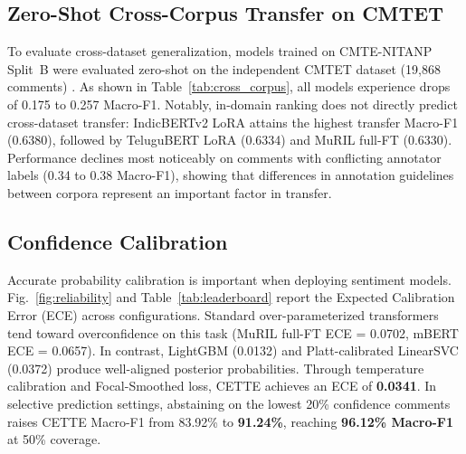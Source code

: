 \documentclass[10pt,conference]{IEEEtran}
\begin{document}
\subsection{Zero-Shot Cross-Corpus Transfer on CMTET}
To evaluate cross-dataset generalization, models trained on CMTE-NITANP Split~B were evaluated zero-shot on the independent CMTET dataset (19{,}868 comments) \cite{kusampudi2021}. As shown in Table~\ref{tab:cross_corpus}, all models experience drops of 0.175 to 0.257 Macro-F1. Notably, in-domain ranking does not directly predict cross-dataset transfer: IndicBERTv2 LoRA attains the highest transfer Macro-F1 (0.6380), followed by TeluguBERT LoRA (0.6334) and MuRIL full-FT (0.6330). Performance declines most noticeably on comments with conflicting annotator labels (0.34 to 0.38 Macro-F1), showing that differences in annotation guidelines between corpora represent an important factor in transfer.

\begin{table}[t]
\caption{Zero-shot cross-corpus generalization from CMTE-NITANP Split~B to CMTET (19{,}868 instances).}
\label{tab:cross_corpus}
\centering
\footnotesize
\setlength{\tabcolsep}{3.5pt}
\end{table}

\subsection{Confidence Calibration}
Accurate probability calibration is important when deploying sentiment models. Fig.~\ref{fig:reliability} and Table~\ref{tab:leaderboard} report the Expected Calibration Error (ECE) across configurations. Standard over-parameterized transformers tend toward overconfidence on this task (MuRIL full-FT ECE = 0.0702, mBERT ECE = 0.0657). In contrast, LightGBM (0.0132) and Platt-calibrated LinearSVC (0.0372) produce well-aligned posterior probabilities. Through temperature calibration and Focal-Smoothed loss, CETTE achieves an ECE of \textbf{0.0341}. In selective prediction settings, abstaining on the lowest 20\% confidence comments raises CETTE Macro-F1 from 83.92\% to \textbf{91.24\%}, reaching \textbf{96.12\% Macro-F1} at 50\% coverage.
\end{document}
